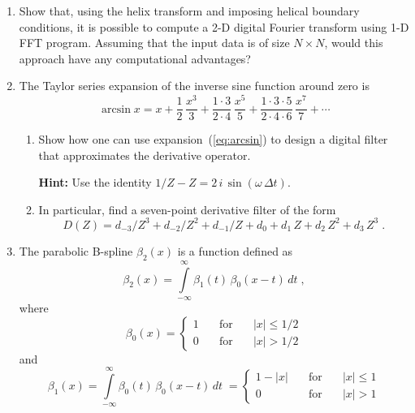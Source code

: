 \begin{enumerate}

\item Show that, using the helix transform and imposing helical boundary conditions, it is possible to compute a 2-D digital Fourier transform using 1-D FFT program. Assuming that the input data is of size $N \times N$, would this approach have any computational advantages?

\item The Taylor series expansion of the inverse sine function around zero is
\begin{equation}
  \label{eq:arcsin}
  \arcsin{x} = x + \frac{1}{2}\,\frac{x^3}{3} + 
  \frac{1 \cdot 3}{2 \cdot 4}\,\frac{x^5}{5} + 
  \frac{1 \cdot 3 \cdot 5}{2 \cdot 4 \cdot 6}\,\frac{x^7}{7} + 
  \cdots
\end{equation}
\begin{enumerate}
\item Show how one can use expansion~(\ref{eq:arcsin}) to design a
  digital filter that approximates the derivative
  operator. 

  \textbf{Hint:} Use the identity $1/Z-Z = 2\,i\,\sin(\omega\,\Delta t)$.

\item In particular, find a seven-point derivative filter of the form
\begin{equation}
  \label{eq:d6}
  D(Z) = d_{-3}/Z^{3} + d_{-2}/Z^{2} + d_{-1}/Z + d_0 + 
  d_1\,Z + d_2\,Z^2 + d_3\,Z^3\;.
\end{equation}
\end{enumerate}

\item The parabolic B-spline $\beta_2(x)$ is a function defined as
 \begin{equation}
   \label{eq:b3} 
   \beta_2(x) = \int\limits_{-\infty}^{\infty} \beta_1(t)\,\beta_0(x-t)\,d t\;,
\end{equation}
where
\begin{equation}
   \label{eq:b1}
   \beta_0(x) = \left\{\begin{array}{lcl} 1 & \quad\mbox{for}\quad & |x| \le 1/2 \\
       0 &\quad \mbox{for}\quad& |x| > 1/2\end{array}\right.
 \end{equation}
and
\begin{equation}
  \label{eq:b2} 
   \beta_1(x) = \int\limits_{-\infty}^{\infty} \beta_0(t)\,\beta_0(x-t)\,d t\;
   = \left\{\begin{array}{lcl} 1-|x| &\quad \mbox{for}\quad& |x| \le 1 \\
       0 & \quad \mbox{for}\quad&  |x| > 1\end{array}\right.
\end{equation}


\end{enumerate}
